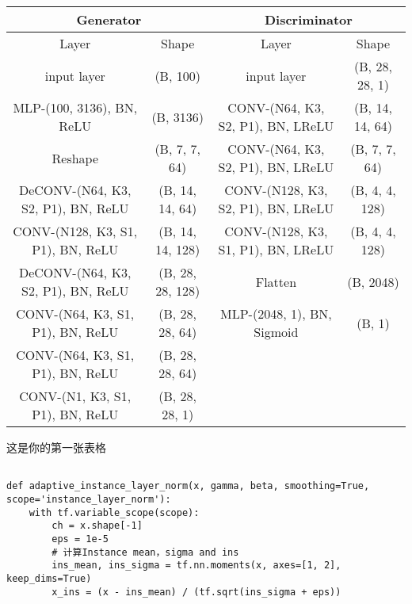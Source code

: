 \documentclass[a4paper, twoside]{ltxdoc}
\numberwithin{equation}{section} %
\begin{document}
{\begin{table}[!htb]
\centering
\footnotesize
\begin{tabular}{cccc}
\hline
\multicolumn{2}{c}{\textbf{Generator}} & \multicolumn{2}{c}{\textbf{Discriminator}} \\ \hline
Layer & Shape & Layer & Shape \\
input layer & (B, 100) & input layer & (B, 28, 28, 1) \\
MLP-(100, 3136), BN, ReLU & (B, 3136) & CONV-(N64, K3, S2, P1), BN, LReLU & (B, 14, 14, 64)\\
Reshape & (B, 7, 7, 64) & CONV-(N64, K3, S2, P1), BN, LReLU & (B, 7, 7, 64)\\
DeCONV-(N64, K3, S2, P1), BN, ReLU & (B, 14, 14, 64) & CONV-(N128, K3, S2, P1), BN, LReLU & (B, 4, 4, 128)\\
CONV-(N128, K3, S1, P1), BN, ReLU & (B, 14, 14, 128) & CONV-(N128, K3, S1, P1), BN, LReLU & (B, 4, 4, 128)\\
DeCONV-(N64, K3, S2, P1), BN, ReLU & (B, 28, 28, 128) & Flatten & (B, 2048)\\
CONV-(N64, K3, S1, P1), BN, ReLU & (B, 28, 28, 64) & MLP-(2048, 1), BN, Sigmoid & (B, 1)\\
CONV-(N64, K3, S1, P1), BN, ReLU & (B, 28, 28, 64) \\
CONV-(N1, K3, S1, P1), BN, ReLU & (B, 28, 28, 1) \\ \hline
\end{tabular}
\end{table}

这是你的第一张表格

\begin{verbatim}

def adaptive_instance_layer_norm(x, gamma, beta, smoothing=True, scope='instance_layer_norm'):
    with tf.variable_scope(scope):
        ch = x.shape[-1]
        eps = 1e-5
        # 计算Instance mean，sigma and ins
        ins_mean, ins_sigma = tf.nn.moments(x, axes=[1, 2], keep_dims=True)
        x_ins = (x - ins_mean) / (tf.sqrt(ins_sigma + eps))
        

\end{verbatim}}
\end{document}
